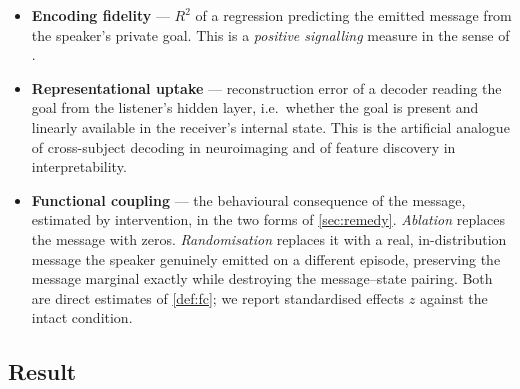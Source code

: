 \documentclass[11pt,a4paper]{article}
\theoremstyle{plain}
\theoremstyle{definition}
\theoremstyle{remark}
\begin{document}
\begin{itemize}[leftmargin=1.4em, itemsep=2pt]
    \item \textbf{Encoding fidelity} --- $R^2$ of a regression predicting the emitted message from
    the speaker's private goal. This is a \emph{positive signalling} measure in the sense of
    \citet{lowe2019pitfalls}.
    \item \textbf{Representational uptake} --- reconstruction error of a decoder reading the goal
    from the listener's hidden layer, i.e.\ whether the goal is present and linearly available in
    the receiver's internal state. This is the artificial analogue of cross-subject decoding in
    neuroimaging and of feature discovery in interpretability.
    \item \textbf{Functional coupling} --- the behavioural consequence of the message, estimated by
    intervention, in the two forms of \cref{sec:remedy}. \emph{Ablation} replaces the message with
    zeros. \emph{Randomisation} replaces it with a real, in-distribution message the speaker
    genuinely emitted on a different episode, preserving the message marginal exactly while
    destroying the message--state pairing. Both are direct estimates of \cref{def:fc}; we report
    standardised effects $z$ against the intact condition.
\end{itemize}

\subsection{Result}
\end{document}
